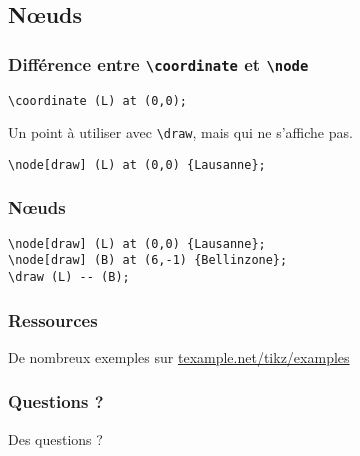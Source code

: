 \documentclass{clic_latex_beamer}
\begin{document}
\subsection{Nœuds}
\begin{frame}[fragile]
\frametitle{Différence entre \texttt{\textbackslash coordinate} et \texttt{\textbackslash node}}

\begin{lstlisting}
\coordinate (L) at (0,0);
\end{lstlisting}

\pause

Un point à utiliser avec \texttt{\textbackslash draw}, mais qui ne s'affiche pas.

\pause
\vspace{1cm}

\begin{lstlisting}
\node[draw] (L) at (0,0) {Lausanne};
\end{lstlisting}

\pause


\end{frame}

\begin{frame}[fragile]
\frametitle{Nœuds}


\pause

\begin{lstlisting}
\node[draw] (L) at (0,0) {Lausanne};
\node[draw] (B) at (6,-1) {Bellinzone};
\draw (L) -- (B);
\end{lstlisting}

\end{frame}
  
 
 

\begin{frame}
\frametitle{Ressources}
De nombreux exemples sur \href{http://www.texample.net/tikz/examples}{texample.net/tikz/examples}
\end{frame}
 
\begin{frame}
\frametitle{Questions ?}
\begin{center}
\Huge Des questions ?
\end{center}
\end{frame}
\end{document}
